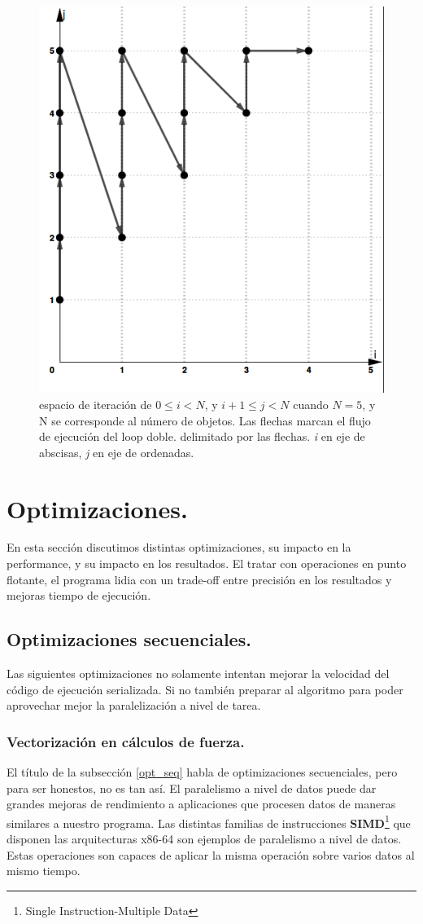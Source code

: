 \documentclass{article}
\begin{document}
\begin{figure}[h!]
	\centering
	\includegraphics[width=0.6\linewidth,height=0.6\textwidth]{resources/loop_anidado_no_tiling_505x565.png}
	\caption{espacio de iteración de $0\leq{i} < {N}$, y $i+1\leq{j} < {N}$
	cuando ${N}=5$, y N se corresponde al número de objetos. Las flechas marcan el flujo de ejecución del loop doble.
	delimitado por las flechas. \textit{i} en eje de abscisas, \textit{j} en eje de ordenadas.}
	\label{fig:no_tiling}
\end{figure}

\section{Optimizaciones.\label{opt}}

En esta sección discutimos distintas optimizaciones, su impacto en la performance,
y su impacto en los resultados. El tratar con operaciones en punto flotante, el programa
lidia con un trade-off entre precisión en los resultados y mejoras tiempo de ejecución.

\subsection{Optimizaciones secuenciales.\label{opt_seq}}
Las siguientes optimizaciones no solamente intentan mejorar la velocidad
del código de ejecución serializada. Si no también preparar al algoritmo
para poder aprovechar mejor la paralelización a nivel de tarea.

\subsubsection{Vectorización en cálculos de fuerza.\label{simd}}
El título de la subsección \ref{opt_seq} habla de optimizaciones secuenciales, pero para ser honestos,
no es tan así. El paralelismo a nivel de datos puede dar grandes mejoras de rendimiento a aplicaciones
que procesen datos de maneras similares a nuestro programa. Las distintas familias de instrucciones
\textbf{SIMD}\footnote{Single Instruction-Multiple Data} que disponen las arquitecturas x86-64 son
ejemplos de paralelismo a nivel de datos. Estas operaciones son capaces de aplicar la misma operación sobre varios
datos al mismo tiempo.
\end{document}

